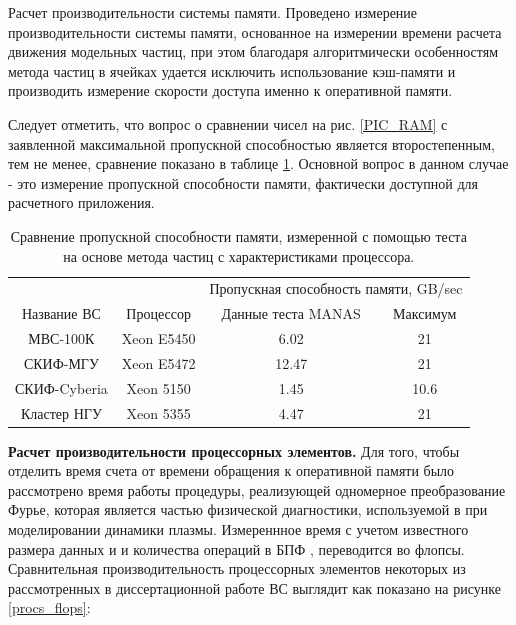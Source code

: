 {Расчет производительности системы памяти.}
Проведено измерение производительности системы памяти, основанное на измерении времени расчета движения модельных частиц, при этом благодаря алгоритмически особенностям метода частиц в ячейках удается исключить использование кэш-памяти и производить измерение скорости доступа именно к оперативной памяти.

Следует отметить, что вопрос о сравнении чисел на рис. \ref{PIC_RAM} с заявленной максимальной пропускной способностью 
является второстепенным, тем не менее, сравнение показано в таблице \ref{PIC_vs_PROC_RAM}. Основной вопрос в данном случае - это измерение пропускной способности памяти,  фактически доступной для расчетного приложения.

\begin{table}[ht]
	\caption{Сравнение пропускной способности памяти, измеренной с помощью теста на основе метода частиц с характеристиками процессора.}
	\label{PIC_vs_PROC_RAM}
	\begin{tabular}{|c|c|c|c|}
		\hline
		&            & \multicolumn{2}{|c|}{Пропускная способность памяти, GB/sec} \\ \cline{3-4}  	
		Название ВС  & Процессор  & Данные теста MANAS & Максимум \\ \hline
		МВС-100К     & Xeon E5450 &     6.02           & 21       \\ \hline 
		СКИФ-МГУ     & Xeon E5472 &     12.47          & 21       \\ \hline     
		СКИФ-Cyberia & Xeon 5150  &     1.45           & 10.6     \\ \hline
		Кластер НГУ  & Xeon 5355  &     4.47           & 21       \\ \hline
	\end{tabular}	
\end{table}
   

\textbf{Расчет производительности процессорных элементов.}
Для того, чтобы отделить время счета от времени обращения к оперативной памяти было рассмотрено время работы процедуры,
реализующей одномерное преобразование Фурье, которая является частью физической диагностики, используемой в при моделировании динамики плазмы. Измереннное время с учетом известного размера данных и и количества операций в БПФ \cite{FFT_OVS}, переводится во флопсы. Сравнительная производительность процессорных элементов некоторых из рассмотренных в диссертационной работе ВС выглядит как показано на рисунке  \ref{procs_flops}:

